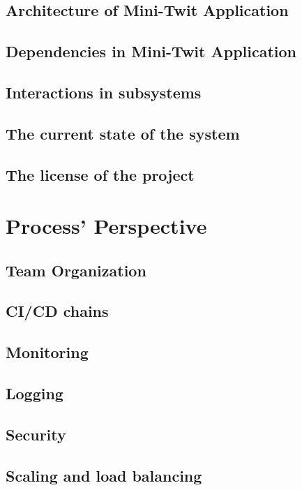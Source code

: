 \documentclass[10pt,a4paper]{article}
\numberwithin{equation}{section}
\begin{document}
\subsection{Architecture of Mini-Twit Application}

\subsection{Dependencies in Mini-Twit Application}

\subsection{Interactions in subsystems}

\subsection{The current state of the system}

\subsection{The license of the project}


\section{Process' Perspective}
\subsection{Team Organization}


\subsection{CI/CD chains}

\subsection{Monitoring}

\subsection{Logging}

\subsection{Security}

\subsection{Scaling and load balancing}


\appendix



\end{document}
